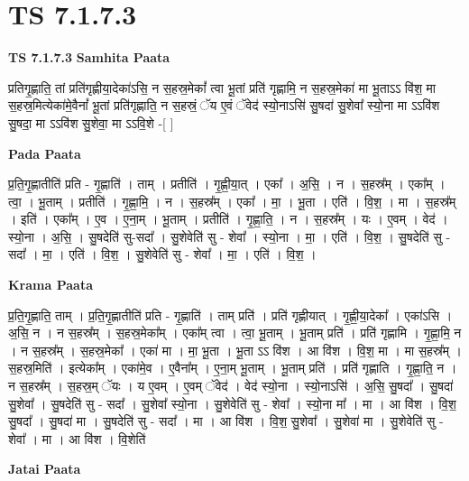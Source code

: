 \documentclass[17pt]{extarticle}
\begin{document}
\section{ TS 7.1.7.3 }

\textbf{TS 7.1.7.3 } \newline
\textbf{Samhita Paata} \newline

प्रतिगृ॒ह्णाति॒ तां प्रति॑गृह्णीया॒देका॑ऽसि॒ न स॒हस्र॒मेकां᳚ त्वा भू॒तां प्रति॑ गृह्णामि॒ न स॒हस्र॒मेका॑ मा भू॒ताऽऽ वि॑श॒ मा स॒हस्र॒मित्येका॑मे॒वैनां᳚ भू॒तां प्रति॑गृह्णाति॒ न स॒हस्रं॒ ॅय ए॒वं ॅवेद॑ स्यो॒नाऽसि॑ सु॒षदा॑ सु॒शेवा᳚ स्यो॒ना मा ऽऽवि॑श सु॒षदा॒ मा ऽऽवि॑श सु॒शेवा॒ मा ऽऽवि॒शे -[  ] \newline

\textbf{Pada Paata} \newline

प्र॒ति॒गृ॒ह्णातीति॑ प्रति - गृ॒ह्णाति॑ । ताम् । प्रतीति॑ । गृ॒ह्णी॒या॒त् । एका᳚ । अ॒सि॒ । न । स॒हस्र᳚म् । एका᳚म् । त्वा॒ । भू॒ताम् । प्रतीति॑ । गृ॒ह्णा॒मि॒ । न । स॒हस्र᳚म् । एका᳚ । मा॒ । भू॒ता । एति॑ । वि॒श॒ । मा । स॒हस्र᳚म् । इति॑ । एका᳚म् । ए॒व । ए॒ना॒म् । भू॒ताम् । प्रतीति॑ । गृ॒ह्णा॒ति॒ । न । स॒हस्र᳚म् । यः । ए॒वम् । वेद॑ । स्यो॒ना । अ॒सि॒ । सु॒षदेति॑ सु-सदा᳚ । सु॒शेवेति॑ सु - शेवा᳚ । स्यो॒ना । मा॒ । एति॑ । वि॒श॒ । सु॒षदेति॑ सु - सदा᳚ । मा॒ । एति॑ । वि॒श॒ । सु॒शेवेति॑ सु - शेवा᳚ । मा॒ । एति॑ । वि॒श॒ ।  \newline


\textbf{Krama Paata} \newline

प्र॒ति॒गृ॒ह्णाति॒ ताम् । प्र॒ति॒गृ॒ह्णातीति॑ प्रति - गृ॒ह्णाति॑ । ताम् प्रति॑ । प्रति॑ गृह्णीयात् । गृ॒ह्णी॒या॒देका᳚ । एका॑ऽसि । अ॒सि॒ न । न स॒हस्र᳚म् । स॒हस्र॒मेका᳚म् । एका᳚म् त्वा । त्वा॒ भू॒ताम् । भू॒ताम् प्रति॑ । प्रति॑ गृह्णामि । गृ॒ह्णा॒मि॒ न । न स॒हस्र᳚म् । स॒हस्र॒मेका᳚ । एका॑ मा । मा॒ भू॒ता । भू॒ता ऽऽ वि॑श । आ वि॑श । वि॒श॒ मा । मा स॒हस्र᳚म् । स॒हस्र॒मिति॑ । इत्येका᳚म् । एका॑मे॒व । ए॒वैना᳚म् । ए॒ना॒म् भू॒ताम् । भू॒ताम् प्रति॑ । प्रति॑ गृह्णाति । गृ॒ह्णा॒ति॒ न । न स॒हस्र᳚म् । स॒हस्र॒म् ॅयः । य ए॒वम् । ए॒वम् ॅवेद॑ । वेद॑ स्यो॒ना । स्यो॒नाऽसि॑ । अ॒सि॒ सु॒षदा᳚ । सु॒षदा॑ सु॒शेवा᳚ । सु॒षदेति॑ सु - सदा᳚ । सु॒शेवा᳚ स्यो॒ना । सु॒शेवेति॑ सु - शेवा᳚ । स्यो॒ना मा᳚ । मा । आ वि॑श । वि॒श॒ सु॒षदा᳚ । सु॒षदा॑ मा । सु॒षदेति॑ सु - सदा᳚ । 
मा । आ वि॑श । वि॒श॒ सु॒शेवा᳚ । सु॒शेवा॑ मा । सु॒शेवेति॑ सु - शेवा᳚ । मा । आ वि॑श । वि॒शेति॑ \newline

\textbf{Jatai Paata} \newline
\end{document}
